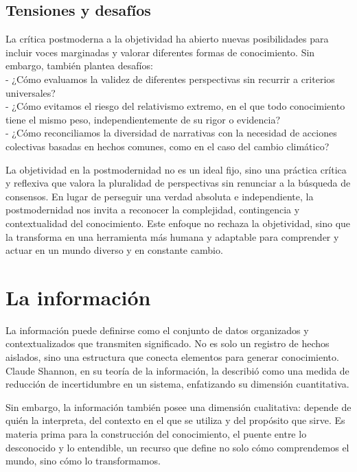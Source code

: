 \documentclass[
  letterpaper,
  DIV=11,
  numbers=noendperiod]{scrreprt}
\begin{document}
\subsection{Tensiones y desafíos}\label{tensiones-y-desafuxedos}

La crítica postmoderna a la objetividad ha abierto nuevas posibilidades
para incluir voces marginadas y valorar diferentes formas de
conocimiento. Sin embargo, también plantea desafíos:\\
- ¿Cómo evaluamos la validez de diferentes perspectivas sin recurrir a
criterios universales?\\
- ¿Cómo evitamos el riesgo del relativismo extremo, en el que todo
conocimiento tiene el mismo peso, independientemente de su rigor o
evidencia?\\
- ¿Cómo reconciliamos la diversidad de narrativas con la necesidad de
acciones colectivas basadas en hechos comunes, como en el caso del
cambio climático?

La objetividad en la postmodernidad no es un ideal fijo, sino una
práctica crítica y reflexiva que valora la pluralidad de perspectivas
sin renunciar a la búsqueda de consensos. En lugar de perseguir una
verdad absoluta e independiente, la postmodernidad nos invita a
reconocer la complejidad, contingencia y contextualidad del
conocimiento. Este enfoque no rechaza la objetividad, sino que la
transforma en una herramienta más humana y adaptable para comprender y
actuar en un mundo diverso y en constante cambio.

\section{La información}\label{la-informaciuxf3n}

La información puede definirse como el conjunto de datos organizados y
contextualizados que transmiten significado. No es solo un registro de
hechos aislados, sino una estructura que conecta elementos para generar
conocimiento. Claude Shannon, en su teoría de la información, la
describió como una medida de reducción de incertidumbre en un sistema,
enfatizando su dimensión cuantitativa.

Sin embargo, la información también posee una dimensión cualitativa:
depende de quién la interpreta, del contexto en el que se utiliza y del
propósito que sirve. Es materia prima para la construcción del
conocimiento, el puente entre lo desconocido y lo entendible, un recurso
que define no solo cómo comprendemos el mundo, sino cómo lo
transformamos.
\end{document}
